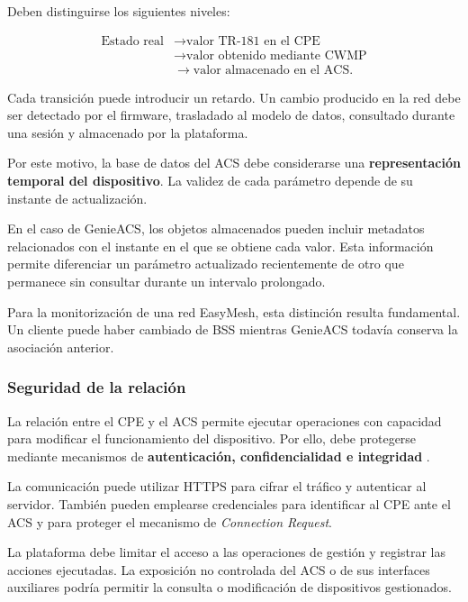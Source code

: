 Deben distinguirse los siguientes niveles:

\[
\begin{aligned}
    \text{Estado real}
    &\longrightarrow
    \text{valor TR-181 en el CPE}\\
    &\longrightarrow
    \text{valor obtenido mediante CWMP}\\
    &\longrightarrow
    \text{valor almacenado en el ACS}.
\end{aligned}
\]

Cada transición puede introducir un retardo. Un cambio producido en la
red debe ser detectado por el firmware, trasladado al modelo de datos,
consultado durante una sesión y almacenado por la plataforma.

Por este motivo, la base de datos del ACS debe considerarse una
\textbf{representación temporal del dispositivo}. La validez de cada
parámetro depende de su instante de actualización.

En el caso de GenieACS, los objetos almacenados pueden incluir metadatos
relacionados con el instante en el que se obtiene cada valor. Esta
información permite diferenciar un parámetro actualizado recientemente de
otro que permanece sin consultar durante un intervalo prolongado.

Para la monitorización de una red EasyMesh, esta distinción resulta
fundamental. Un cliente puede haber cambiado de BSS mientras GenieACS
todavía conserva la asociación anterior.


\subsubsection*{Seguridad de la relación}

La relación entre el CPE y el ACS permite ejecutar operaciones con
capacidad para modificar el funcionamiento del dispositivo. Por ello,
debe protegerse mediante mecanismos de
\textbf{autenticación, confidencialidad e integridad}
\cite{bbf_tr069}.

La comunicación puede utilizar HTTPS para cifrar el tráfico y autenticar
al servidor. También pueden emplearse credenciales para identificar al
CPE ante el ACS y para proteger el mecanismo de
\textit{Connection Request}.

La plataforma debe limitar el acceso a las operaciones de gestión y
registrar las acciones ejecutadas. La exposición no controlada del ACS o
de sus interfaces auxiliares podría permitir la consulta o modificación
de dispositivos gestionados.

